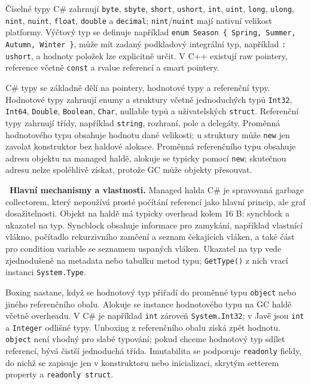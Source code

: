 \begin{odpoved}
Číselné typy C\# zahrnují \texttt{byte}, \texttt{sbyte}, \texttt{short},
\texttt{ushort}, \texttt{int}, \texttt{uint}, \texttt{long}, \texttt{ulong},
\texttt{nint}, \texttt{nuint}, \texttt{float}, \texttt{double} a \texttt{decimal};
\texttt{nint}/\texttt{nuint} mají nativní velikost platformy. Výčtový typ se definuje
například \texttt{enum Season \{ Spring, Summer, Autumn, Winter \}}, může mít zadaný
podkladový integrální typ, například \texttt{: ushort}, a hodnoty položek lze explicitně
určit. V C++ existují raw pointery, reference včetně \texttt{const} a rvalue referencí
a smart pointery.

C\# typy se základně dělí na pointery, hodnotové typy a referenční typy. Hodnotové typy
zahrnují enumy a struktury včetně jednoduchých typů \texttt{Int32}, \texttt{Int64},
\texttt{Double}, \texttt{Boolean}, \texttt{Char}, nullable typů a uživatelských
\texttt{struct}. Referenční typy zahrnují třídy, například \texttt{string}, rozhraní,
pole a delegáty. Proměnná hodnotového typu obsahuje hodnotu dané velikosti; u struktury
může \texttt{new} jen zavolat konstruktor bez haldové alokace. Proměnná referenčního
typu obsahuje adresu objektu na managed haldě, alokuje se typicky pomocí \texttt{new};
skutečnou adresu nelze spoléhlivě získat, protože GC může objekty přesouvat.

\noindent{}\ \textbf{Hlavní mechanismy a vlastnosti.}
Managed halda C\# je spravovaná garbage collectorem, který nepoužívá prosté počítání
referencí jako hlavní princip, ale graf dosažitelnosti. Objekt na haldě má typicky
overhead kolem 16 B: syncblock a ukazatel na typ. Syncblock obsahuje informace pro
zamykání, například vlastnící vlákno, počítadlo rekurzivního zamčení a seznam čekajících
vláken, a také část pro condition variable se seznamem uspaných vláken. Ukazatel na typ
vede zjednodušeně na metadata nebo tabulku metod typu; \texttt{GetType()} z nich vrací
instanci \texttt{System.Type}.

Boxing nastane, když se hodnotový typ přiřadí do proměnné typu \texttt{object} nebo
jiného referenčního obalu. Alokuje se instance hodnotového typu na GC haldě včetně
overheadu. V C\# je například \texttt{int} zároveň \texttt{System.Int32}; v Javě jsou
\texttt{int} a \texttt{Integer} odlišné typy. Unboxing z referenčního obalu získá zpět
hodnotu. \texttt{object} není vhodný pro slabé typování; pokud chceme hodnotový typ
sdílet referencí, bývá čistší jednoduchá třída. Imutabilita se podporuje \texttt{readonly}
fieldy, do nichž se zapisuje jen v konstruktoru nebo inicializaci, skrytým setterem
property a \texttt{readonly struct}.


\end{odpoved}
